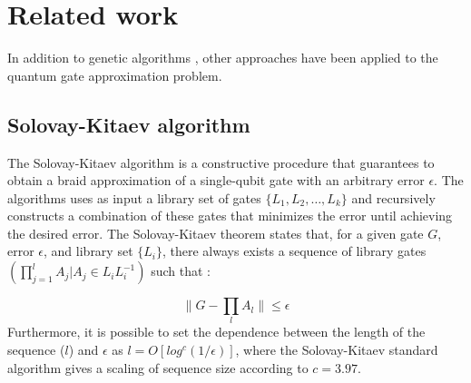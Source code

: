 
     

\section{Related work} \label{sec:RELWORK}


 In addition to genetic algorithms  \cite{Mcdonald_and_Katzgraber:2013}, other approaches have been applied to the quantum gate approximation problem.

 \subsection{Solovay-Kitaev algorithm}
 
   The Solovay-Kitaev algorithm \cite{Kitaev:2003,Dawson_et_al:2005} is a constructive procedure that guarantees to obtain a braid approximation of a single-qubit gate with an arbitrary error $\epsilon$. The algorithms uses as input a library set of gates $\{L_1,L_2,\dots,L_k\}$ and recursively constructs a combination of these gates that minimizes the error until achieving the desired error.
     The Solovay-Kitaev theorem states \cite{Trung_et_al:2012} that, for a given gate $G$, error $\epsilon$, and library set $\{L_i\}$, there always exists a sequence of library gates $(\prod_{j=1}^{l}A_j | A_j \in  {L_i}{L_i^{-1}})$ such that \cite{Dawson_et_al:2005}:

\begin{equation}
 \| G- \prod_lA_l\| \leq \epsilon
\end{equation}
Furthermore, it is possible to set the dependence between the length of the sequence ($l$) and $\epsilon$ as $l=O[log^{c}(1/\epsilon)]$, where the Solovay-Kitaev standard algorithm gives a scaling of sequence size according to $c=3.97$. 


